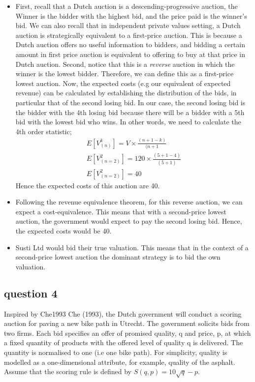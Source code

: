 \documentclass[11pt]{article} %
\begin{document}
	\begin{itemize}
            \item First, recall that a Dutch auction is a descending-progressive auction, the Winner is the bidder with the highest bid, and the price paid is the winner's bid. We can also recall that in independent private values setting, a Dutch auction is strategically equivalent to a first-price auction. This is because a Dutch auction offers no useful information to bidders, and bidding a certain amount in first price auction is equivalent to offering to buy at that price in Dutch auction.
            Second, notice that this is a \textit{reverse} auction in which the winner is the lowest bidder.
            Therefore, we can define this as a first-price lowest auction.
            Now, the expected costs (e.g our equivalent of expected revenue) can be calculated by establishing the distribution of the bids, in particular that of the second losing bid. 
            In our case, the second losing bid is the bidder with the 4th losing bid because there will be a bidder with a 5th bid with the lowest bid who wins.
            In other words, we need to calculate the 4th order statistic;
            \begin{align*}
            E[V^{k}_{(n)}] = V \times \frac{(n + 1 -k)}{(n+1} \\
            E[V^{2}_{(n=2)}] = 120 \times \frac{(5+1-4)}{(5+1)} \\
            E[V^{2}_{(n=2)}] = 40
            \end{align*}
            Hence the expected costs of this auction are 40.
            \item Following the revenue equivalence theorem, for this reverse auction, we can expect a cost-equivalence. This means that with a second-price lowest auction, the government would expect to pay the second losing bid. Hence, the expected costs would be 40.
            \item Susti Ltd would bid their true valuation. This means that in the context of a second-price lowest auction the dominant strategy is to bid the own valuation.
            \end{itemize} 

\subsection{question 4}

 Inspired by {Che1993} Che (1993), the Dutch government will conduct a scoring auction for paving a new bike path in Utrecht. The government solicits bids from two firms. Each bid specifies an offer of promised quality, q and price, p, at which a fixed quantity of products with the offered level of quality q is delivered. The quantity is normalised to one (i.e one bike path). For simplicity, quality is modelled as a one-dimensional attribute, for example, quality of the asphalt. Assume that the scoring rule is defined by $S(q,p)=10 \sqrt{q}-p$. 
 
\end{document}
